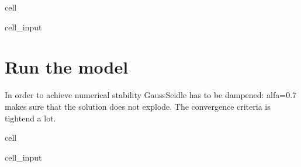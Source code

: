 \documentclass[letterpaper,10pt,english]{jupyterBook}
\begin{document}
\begin{sphinxuseclass}{cell}\begin{sphinxVerbatimInput}

\begin{sphinxuseclass}{cell_input}
\begin{sphinxVerbatim}[commandchars=\\\{\}]
            
  
\end{sphinxVerbatim}

\end{sphinxuseclass}\end{sphinxVerbatimInput}

\end{sphinxuseclass}

\section{Run the model}
\label{\detokenize{content/howto/onboard/eviews/onboard one model from  wf1:run-the-model}}
\sphinxAtStartPar
In order to achieve numerical stability Gauss\sphinxhyphen{}Seidle has to be dampened: alfa=0.7 makes sure that the solution does not explode.
The convergence criteria is tightend a lot.

\begin{sphinxuseclass}{cell}\begin{sphinxVerbatimInput}

\begin{sphinxuseclass}{cell_input}
\begin{sphinxVerbatim}[commandchars=\\\{\}]
  
  
\end{sphinxVerbatim}

\end{sphinxuseclass}\end{sphinxVerbatimInput}

\end{sphinxuseclass}
\end{document}
